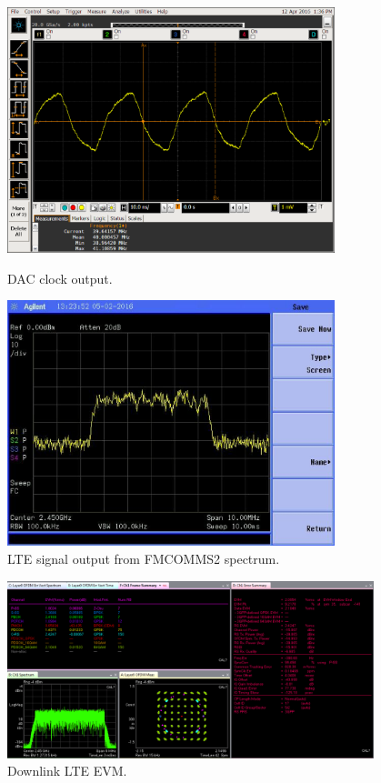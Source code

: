 \begin{figure}[htbp]
    \centering
    \includegraphics[width=0.85\textwidth,
    trim={{.17\textwidth} 0 {.02\textwidth} {.24\textwidth}},
    clip]{./figures/oscill_ad9361_dac_clk}
    \caption{ DAC clock output.
    \label{fig:dacclk}}

    \centering
    \includegraphics[width=0.85\textwidth,
    trim={0 0 {.27\textwidth} {.1\textwidth}},
    clip]{./figures/lte_5m}
    \caption{ LTE signal output from FMCOMMS2 spectrum.
    \label{fig:lte5m}}
\end{figure}

\begin{figure}[htbp]
    \centering
    \includegraphics[width=0.95\textwidth]{./figures/evm_5m}
    \caption{ Downlink LTE EVM.
    \label{fig:evm}}
\end{figure}

